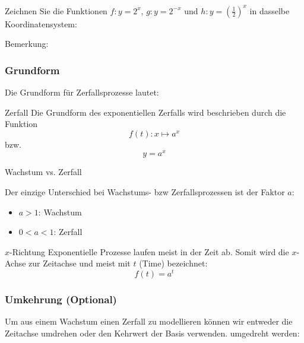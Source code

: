 \newpage



Zeichnen Sie die Funktionen $f: y=2^x$, $g: y=2^{-x}$ und $h: y=\left(\frac12\right)^x$ in dasselbe Koordinatensystem:


Bemerkung: 
\newpage

\subsubsection{Grundform} 
Die Grundform für Zerfallsprozesse lautet:

\begin{definition}{Zerfall}{}
  Die Grundform des exponentiellen Zerfalls wird beschrieben durch die Funktion
$$f(t): x \mapsto a^x$$
  bzw.
  $$y = a^x$$
\end{definition}


\begin{gesetz}{Wachstum vs. Zerfall}{}

  Der einzige Unterschied bei Wachstums- bzw Zerfallsprozessen ist der
  Faktor $a$:

  \begin{itemize}
    \item $a>1$: Wachstum
    \item $0<a<1$: Zerfall
  \end{itemize}
  
\end{gesetz}

\begin{bemerkung}{$x$-Richtung}{}
  Exponentielle Prozesse laufen meist in der Zeit ab. Somit wird
  die $x$-Achse zur Zeitachse und meist mit $t$ (Time) bezeichnet:
  $$f(t) = a^t$$
  \end{bemerkung}


\subsubsection{Umkehrung (Optional)}
Um aus einem Wachstum einen Zerfall zu modellieren können wir entweder
die Zeitachse umdrehen oder den Kehrwert der Basis verwenden.
umgedreht werden:

